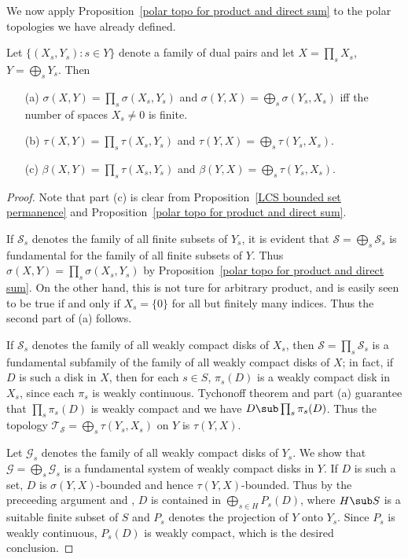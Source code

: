 We now apply Proposition~\ref{polar topo for product and direct sum} to the polar topologies we have already defined.
\begin{proposition}\label{weak Macky strong topo for product and direct sum}
Let $\{(X_s,Y_s):s\in Y\}$ denote a family of dual pairs and let $X=\prod_sX_s$, $Y=\bigoplus_sY_s$. Then
\begin{itemize}
\item[(a)] $\sigma(X,Y)=\prod_s\sigma(X_s,Y_s)$ and $\sigma(Y,X)=\bigoplus_s\sigma(Y_s,X_s)$ iff the number of spaces $X_s\neq 0$ is finite.
\item[(b)] $\tau(X,Y)=\prod_s\tau(X_s,Y_s)$ and $\tau(Y,X)=\bigoplus_s\tau(Y_s,X_s)$.
\item[(c)] $\beta(X,Y)=\prod_s\tau(X_s,Y_s)$ and $\beta(Y,X)=\bigoplus_s\tau(Y_s,X_s)$.
\end{itemize}
\end{proposition}
\begin{proof}
Note that part (c) is clear from Proposition~\ref{LCS bounded set permanence} and Proposition~\ref{polar topo for product and direct sum}.\par
If $\mathcal{S}_s$ denotes the family of all finite subsets of $Y_s$, it is evident that $\mathcal{S}=\bigoplus_s\mathcal{S}_s$ is fundamental for the family of all finite subsets of $Y$. Thus $\sigma(X,Y)=\prod_s\sigma(X_s,Y_s)$ by Proposition~\ref{polar topo for product and direct sum}. On the other hand, this is not ture for arbitrary product, and is easily seen to be true if and only if $X_s=\{0\}$ for all but finitely many indices. Thus the second part of (a) follows.\par
If $\mathcal{S}_s$ denotes the family of all weakly compact disks of $X_s$, then $\mathcal{S}=\prod_s\mathcal{S}_s$ is a fundamental subfamily of the family of all weakly compact disks of $X$; in fact, if $D$ is such a disk in $X$, then for each $s\in S$, $\pi_s(D)$ is a weakly compact disk in $X_s$, since each $\pi_s$ is weakly continuous. Tychonoff theorem and part (a) guarantee that $\prod_s\pi_s(D)$ is weakly compact and we have $D\sub\prod_s\pi_s(D)$. Thus the topology $\mathcal{T}_{\mathcal{S}}=\bigoplus_s\tau(Y_s,X_s)$ on $Y$ is $\tau(Y,X)$.\par
Let $\mathcal{G}_s$ denotes the family of all weakly compact disks of $Y_s$. We show that $\mathcal{G}=\bigoplus_s\mathcal{G}_s$ is a fundamental system of weakly compact disks in $Y$. If $D$ is such a set, $D$ is $\sigma(Y,X)$-bounded and hence $\tau(Y,X)$-bounded. Thus by the preceeding argument and , $D$ is contained in $\bigoplus_{s\in H}P_s(D)$, where $H\sub S$ is a suitable finite subset of $S$ and $P_s$ denotes the projection of $Y$ onto $Y_s$. Since $P_s$ is weakly continuous, $P_s(D)$ is weakly compact, which is the desired conclusion.
\end{proof}
